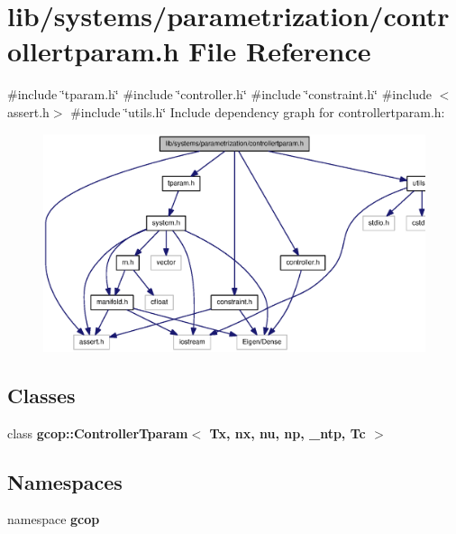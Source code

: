 \section{lib/systems/parametrization/controllertparam.h \-File \-Reference}
\label{controllertparam_8h}
{\ttfamily \#include \char`\"{}tparam.\-h\char`\"{}}\*
{\ttfamily \#include \char`\"{}controller.\-h\char`\"{}}\*
{\ttfamily \#include \char`\"{}constraint.\-h\char`\"{}}\*
{\ttfamily \#include $<$assert.\-h$>$}\*
{\ttfamily \#include \char`\"{}utils.\-h\char`\"{}}\*
\-Include dependency graph for controllertparam.\-h\-:
\nopagebreak
\begin{figure}[H]
\begin{center}
\leavevmode
\includegraphics[width=350pt]{controllertparam_8h__incl}
\end{center}
\end{figure}
\subsection*{\-Classes}
\begin{DoxyCompactItemize}
\item 
class {\bf gcop\-::\-Controller\-Tparam$<$ Tx, nx, nu, np, \-\_\-ntp, Tc $>$}
\end{DoxyCompactItemize}
\subsection*{\-Namespaces}
\begin{DoxyCompactItemize}
\item 
namespace {\bf gcop}
\end{DoxyCompactItemize}
